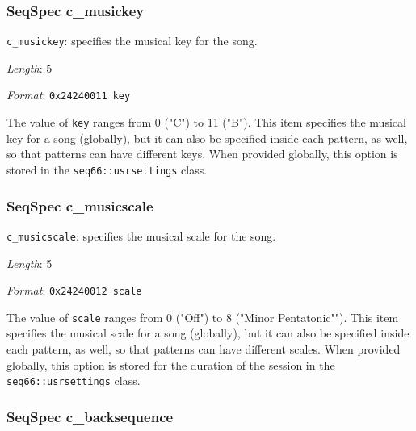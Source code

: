\subsubsection{SeqSpec c\_musickey}
\label{subsubsec:midi_format_track_seqspec_musickey}

   \begin{description}
      \item \texttt{c\_musickey}: specifies the musical key for the song.
      \item \textsl{Length}: 5
      \item \textsl{Format}: \texttt{0x24240011 key}
   \end{description}

   The value of \texttt{key} ranges from 0 ("C") to 11 ("B").
   This item specifies the musical key for a song (globally), but it
   can also be specified inside each pattern, as well, so that patterns
   can have different keys.
   When provided globally, this option is stored in the
   \texttt{seq66::usrsettings} class.

\subsubsection{SeqSpec c\_musicscale}
\label{subsubsec:midi_format_track_seqspec_musicscale}

   \begin{description}
      \item \texttt{c\_musicscale}: specifies the musical scale for the song.
      \item \textsl{Length}: 5
      \item \textsl{Format}: \texttt{0x24240012 scale}
   \end{description}

   The value of \texttt{scale} ranges from 0 ("Off") to 8 ("Minor Pentatonic"").
   This item specifies the musical scale for a song (globally), but it
   can also be specified inside each pattern, as well, so that patterns
   can have different scales.
   When provided globally, this option is stored for the duration
   of the session in the
   \texttt{seq66::usrsettings} class.

\subsubsection{SeqSpec c\_backsequence}
\label{subsubsec:midi_format_track_seqspec_backsequence}

